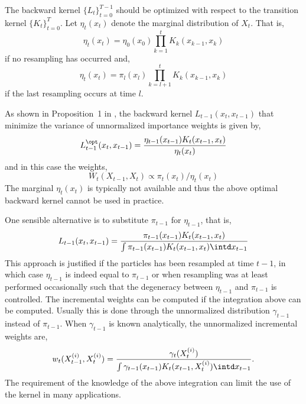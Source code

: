 The backward kernel $\{L_t\}_{t=0}^{T-1}$ should be optimized with respect to
the transition kernel $\{K_t\}_{t=0}^T$. Let $\eta_t(x_t)$ denote the marginal
distribution of $X_t$. That is,
\begin{equation}
  \eta_t(x_t) = \eta_0(x_0)\prod_{k=1}^tK_k(x_{k-1},x_k)
\end{equation}
if no resampling has occurred and,
\begin{equation}
  \eta_t(x_t) = \pi_l(x_l)\prod_{k=l+1}^tK_k(x_{k-1},x_k)
\end{equation}
if the last resampling occurs at time $l$.

As shown in Proposition~1{} in \cite{DelMoral:2006hc}, the backward kernel
$L_{t-1}(x_t, x_{t-1})$ that minimize the variance of unnormalized importance
weights is given by,
\begin{equation}
  L_{t-1}^{\opt}(x_t,x_{t-1}) =
  \frac{\eta_{t-1}(x_{t-1})K_t(x_{t-1},x_t)}{\eta_t(x_t)}
\end{equation}
and in this case the weights,
\begin{equation}
  W_t(X_{t-1},X_t) \propto \pi_t(x_t)/\eta_t(x_t)
\end{equation}
The marginal $\eta_t(x_t)$ is typically not available and thus the above
optimal backward kernel cannot be used in practice.

One sensible alternative is to substitute $\pi_{t-1}$ for $\eta_{t-1}$, that
is,
\begin{equation}
  L_{t-1}(x_t,x_{t-1}) =
  \frac{\pi_{t-1}(x_{t-1})K_t(x_{t-1},x_t)}
  {\int \pi_{t-1}(x_{t-1})K_t(x_{t-1},x_t)\intd x_{t-1}}
  \label{eq:subopt back kernel}
\end{equation}
This approach is justified if the particles has been resampled at time $t-1$,
in which case $\eta_{t-1}$ is indeed equal to $\pi_{t-1}$ or when resampling
was at least performed occasionally such that the degeneracy between
$\eta_{t-1}$ and $\pi_{t-1}$ is controlled. The incremental weights can be
computed if the integration above can be computed. Usually this is done
through the unnormalized distribution $\gamma_{t-1}$ instead of $\pi_{t-1}$.
When $\gamma_{t-1}$ is known analytically, the unnormalized incremental
weights are,
\begin{equation}
  w_t(X_{t-1}^{(i)},X_t^{(i)}) =
  \frac{\gamma_t(X_t^{(i)})}
  {\int\gamma_{t-1}(x_{t-1})K_t(x_{t-1},X_t^{(i)})\intd x_{t-1}}.
  \label{eq:inc weight subopt}
\end{equation}
The requirement of the knowledge of the above integration can limit the use of
the kernel in many applications.

